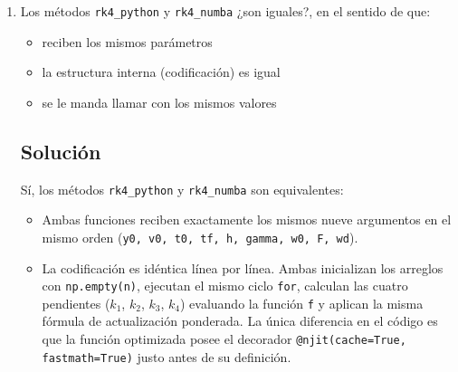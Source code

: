 \begin{enumerate}[label=\arabic*., leftmargin=*]
\begin{enumerate}[label=(\alph*), leftmargin=*]
        El modelo físico parte de la ecuación diferencial de segundo orden $y'' + 2\gamma y' + \omega_0^2 y = F \cos(\omega_d t)$. El código reescribe el modelo en el siguiente sistema equivalente de ecuaciones:

        \begin{itemize}[leftmargin=*]
            \item $y' = v$
            \item $v' = F \cos(\omega_d t) - 2\gamma v - \omega_0^2 y$
        \end{itemize}

        La equivalencia es exacta porque tanto la función \texttt{rk4\_python} como \texttt{rk4\_numba} mandan llamar a la misma función del campo vectorial \texttt{f(t, y, v, gamma, w0, F, wd)} para calcular los pesos intermedios en cada iteración del bucle.

        \item Los métodos \texttt{rk4\_python} y \texttt{rk4\_numba} ¿son iguales?, en el sentido de que:
        \begin{itemize}[leftmargin=*]
            \item reciben los mismos parámetros
            \item la estructura interna (codificación) es igual
            \item se le manda llamar con los mismos valores
        \end{itemize}
        \subsection*{Solución}
        Sí, los métodos \texttt{rk4\_python} y \texttt{rk4\_numba} son equivalentes:

        \begin{itemize}[leftmargin=*]
            \item Ambas funciones reciben exactamente los mismos nueve argumentos en el mismo orden (\texttt{y0, v0, t0, tf, h, gamma, w0, F, wd}).

            \item La codificación es idéntica línea por línea. Ambas inicializan los arreglos con \texttt{np.empty(n)}, ejecutan el mismo ciclo \texttt{for}, calculan las cuatro pendientes ($k_1$, $k_2$, $k_3$, $k_4$) evaluando la función \texttt{f} y aplican la misma fórmula de actualización ponderada. La única diferencia en el código es que la función optimizada posee el decorador \texttt{@njit(cache=True, fastmath=True)} justo antes de su definición.


\end{itemize}
\end{enumerate}
\end{enumerate}
